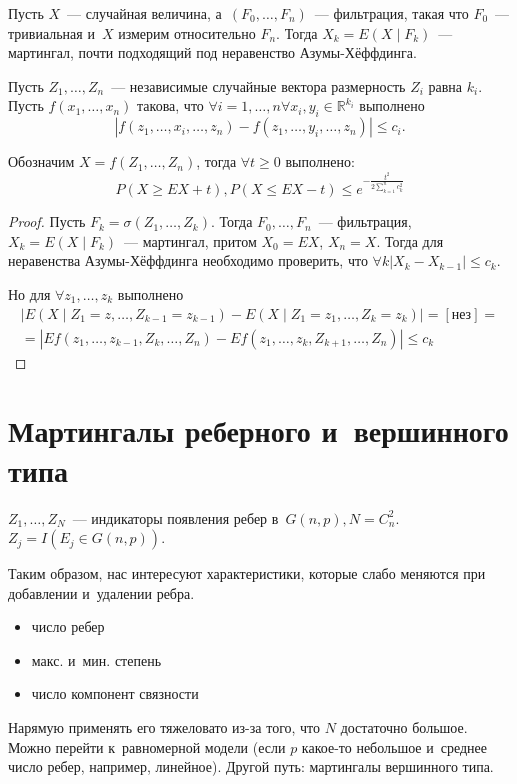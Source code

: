 \documentclass{article}
\begin{document}
Пусть $X$~--- случайная величина, а~$(F_0, \ldots, F_n)$~--- фильтрация, такая что $F_0$~---
тривиальная и~$X$ измерим относительно $F_n$. Тогда $X_k = E(X \mid F_k)$~--- мартингал, почти
подходящий под неравенство Азумы-Хёффдинга.

\begin{corollary}
	Пусть $Z_1, \ldots, Z_n$~--- независимые случайные вектора размерность $Z_i$ равна $k_i$.
	Пусть $f(x_1, \ldots, x_n)$ такова, что $\forall i=1,\ldots,n \forall x_i, y_i \in
	\mathbb{R}^{k_i}$ выполнено
	$$|f(z_1, \ldots, x_i, \ldots, z_n) - f(z_1, \ldots, y_i, \ldots, z_n)| \le c_i.$$

	Обозначим $X = f(Z_1, \ldots, Z_n)$, тогда $\forall t \ge 0$ выполнено:
	$$ P(X \ge EX + t), P(X \le EX - t) \le e^{-\frac{t^2}{2\sum\limits_{k=1}^n c_k^2}} $$
\end{corollary}
\begin{proof}
	Пусть $F_k = \sigma(Z_1, \ldots, Z_k)$. Тогда $F_0, \ldots, F_n$~--- фильтрация, $X_k = E(X \mid
	F_k)$~--- мартингал, притом $X_0 = EX$, $X_n = X$. Тогда для неравенства Азумы-Хёффдинга
	необходимо проверить, что $\forall k |X_k - X_{k-1}| \le c_k$.

	Но для $\forall z_1, \ldots, z_k$ выполнено
	\begin{multline*}
		|E(X \mid Z_1 = z, \ldots, Z_{k-1}=z_{k-1}) - E(X \mid Z_1 = z_1, \ldots, Z_k=z_k)| =
		[\text{нез}] =\\=
		|Ef(z_1, \ldots, z_{k-1}, Z_k, \ldots, Z_n) - Ef(z_1,\ldots,z_k,Z_{k+1},\ldots,Z_n)| \le c_k
	\end{multline*}
\end{proof}

\section{Мартингалы реберного и~вершинного типа}

$Z_1, \ldots, Z_N$~--- индикаторы появления ребер в~$G(n, p), N = C_n^2$. $Z_j =
I(E_j \in G(n, p))$.

Таким образом, нас интересуют характеристики, которые слабо меняются при добавлении и~удалении
ребра.
\begin{itemize}
	\item число ребер
	\item макс. и~мин. степень
	\item число компонент связности
\end{itemize}

Нарямую применять его тяжеловато из-за того, что $N$ достаточно большое. Можно перейти к~равномерной
модели (если $p$ какое-то небольшое и~среднее число ребер, например, линейное). Другой путь:
мартингалы вершинного типа.
\end{document}
